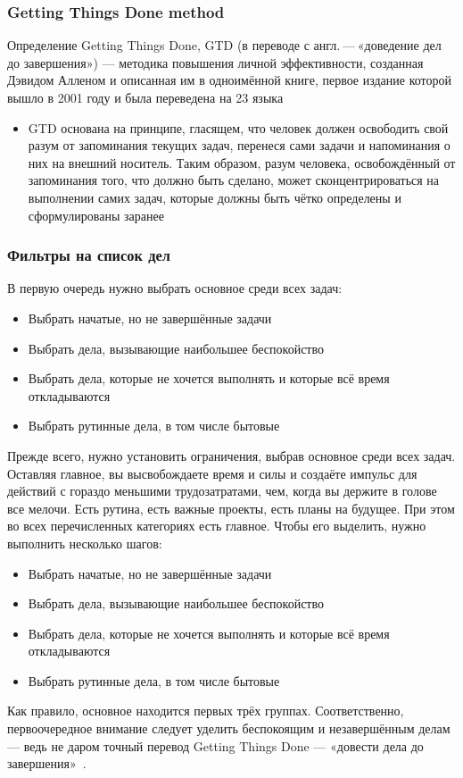 \documentclass{../industrial-development}
\begin{document}
\begin{frame} \frametitle{Getting Things Done method}
  \begin{block}{Определение}
    Getting Things Done, GTD (в переводе с англ. — «доведение дел до завершения») --- методика повышения личной эффективности, созданная Дэвидом Алленом и описанная им в одноимённой книге, первое издание которой вышло в 2001 году и была переведена на 23 языка
  \end{block}
  \begin{itemize}
  \item GTD основана на принципе, гласящем, что человек должен освободить свой разум от запоминания текущих задач, перенеся сами задачи и напоминания о них на внешний носитель. Таким образом, разум человека, освобождённый от запоминания того, что должно быть сделано, может сконцентрироваться на выполнении самих задач, которые должны быть чётко определены и сформулированы заранее
  \end{itemize}
\end{frame}

\begin{frame} \frametitle{Фильтры на список дел}
В первую очередь нужно выбрать основное среди всех задач:
  \begin{itemize}
  \item Выбрать начатые, но не завершённые задачи
  \item Выбрать дела, вызывающие наибольшее беспокойство
  \item Выбрать дела, которые не хочется выполнять и которые всё время откладываются
  \item Выбрать рутинные дела, в том числе бытовые
  \end{itemize}
\end{frame}

\lecturenotes

Прежде всего, нужно установить ограничения, выбрав основное среди всех задач. Оставляя главное, вы высвобождаете время и силы и создаёте импульс для действий с гораздо меньшими трудозатратами, чем, когда вы держите в голове все мелочи. Есть рутина, есть важные проекты, есть планы на будущее. При этом во всех перечисленных категориях есть главное. Чтобы его выделить, нужно выполнить несколько шагов:
  \begin{itemize}
  \item Выбрать начатые, но не завершённые задачи
  \item Выбрать дела, вызывающие наибольшее беспокойство
  \item Выбрать дела, которые не хочется выполнять и которые всё время откладываются
  \item Выбрать рутинные дела, в том числе бытовые
  \end{itemize}
Как правило, основное находится первых трёх группах. Соответственно, первоочередное внимание следует уделить беспокоящим и незавершённым делам — ведь не даром точный перевод Getting Things Done — «довести дела до завершения»~\cite{GTDHabr}.
\end{document}
